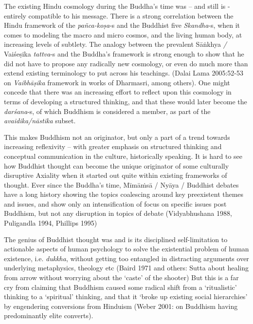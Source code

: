 The existing Hindu cosmology during the Buddha’s time was – and still is - entirely compatible to his message. There is a strong correlation between the Hindu framework of the \textit{pañca-koṣa}-s and the Buddhist five \textit{Skandha}-s, when it comes to modeling the macro and micro cosmos, and the living human body, at increasing levels of subtlety. The analogy between the prevalent Sāṅkhya \textit{/} Vaiśeṣika \textit{tattva}-s and the Buddha’s framework is strong enough to show that he did not have to propose any radically new cosmology, or even do much more than extend existing terminology to put across his teachings. (Dalai Lama 2005:52-53 on \textit{Vaibhāṣika} framework in works of Dharmasri, among others). One might concede that there was an increasing effort to reflect upon this cosmology in terms of developing a structured thinking, and that these would later become the \textit{darśana}-s, of which Buddhism is considered a member, as part of the \textit{avaidika/nāstika} subset.

This makes Buddhism not an originator, but only a part of a trend towards increasing reflexivity – with greater emphasis on structured thinking and conceptual communication in the culture, historically speaking. It is hard to see how Buddhist thought can become the unique originator of some culturally disruptive Axiality when it started out quite within existing frameworks of thought. Ever since the Buddha’s time, Mīmāṁsā / Nyāya / Buddhist debates have a long history showing the topics coalescing around key preexistent themes and issues, and show only an intensification of focus on specific issues post Buddhism, but not any disruption in topics of debate (Vidyabhushana 1988, Puligandla 1994, Phillips 1995)

The genius of Buddhist thought was and is its disciplined self-limitation to actionable aspects of human psychology to solve the existential problem of human existence, i.e. \textit{dukkha}, without getting too entangled in distracting arguments over underlying metaphysics, theology etc (Baird 1971 and others: Sutta about healing from arrow without worrying about the ‘caste’ of the shooter) But this is a far cry from claiming that Buddhism caused some radical shift from a ‘ritualistic’ thinking to a ‘spiritual’ thinking, and that it ‘broke up existing social hierarchies’ by engendering conversions from Hinduism (Weber 2001: on Buddhism having predominantly elite converts).

